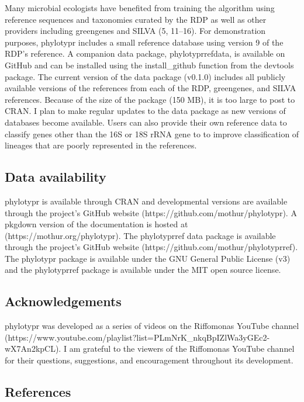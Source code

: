 \documentclass[
  11pt,
]{article}
\begin{document}
Many microbial ecologists have benefited from training the algorithm
using reference sequences and taxonomies curated by the RDP as well as
other providers including greengenes and SILVA (5, 11--16). For
demonstration purposes, phylotypr includes a small reference database
using version 9 of the RDP's reference. A companion data package,
phylotyprrefdata, is available on GitHub and can be installed using the
install\_github function from the devtools package. The current version
of the data package (v0.1.0) includes all publicly available versions of
the references from each of the RDP, greengenes, and SILVA references.
Because of the size of the package (150 MB), it is too large to post to
CRAN. I plan to make regular updates to the data package as new versions
of databases become available. Users can also provide their own
reference data to classify genes other than the 16S or 18S rRNA gene to
to improve classification of lineages that are poorly represented in the
references.

\subsection{Data availability}\label{data-availability}

phylotypr is available through CRAN and developmental versions are
available through the project's GitHub website
(https://github.com/mothur/phylotypr). A pkgdown version of the
documentation is hosted at (https://mothur.org/phylotypr). The
phylotyprref data package is available through the project's GitHub
website (https://github.com/mothur/phylotyprref). The phylotypr package
is available under the GNU General Public License (v3) and the
phylotyprref package is available under the MIT open source license.

\subsection{Acknowledgements}\label{acknowledgements}

phylotypr was developed as a series of videos on the Riffomonas YouTube
channel
(https://www.youtube.com/playlist?list=PLmNrK\_nkqBpIZlWa3yGEc2-wX7An2kpCL).
I am grateful to the viewers of the Riffomonas YouTube channel for their
questions, suggestions, and encouragement throughout its development.

\newpage

\subsection{References}\label{references}
\end{document}
